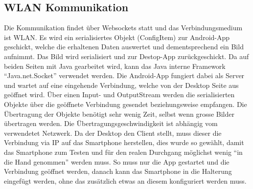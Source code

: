 \subsection{WLAN Kommunikation}

Die Kommunikation findet über Websockets statt und das Verbindungsmedium ist WLAN.
Es wird ein serialisiertes Objekt (ConfigItem) zur Android-App geschickt, welche die erhaltenen 
Daten auswertet und dementsprechend ein Bild aufnimmt. Das Bild wird serialisiert und zur 
Destop-App zurückgeschickt.
Da auf beiden Seiten mit Java gearbeitet wird, kann das Java interne Framework \enquote{Java.net.Socket} verwendet werden. 
Die Android-App fungiert dabei als Server und wartet auf eine eingehende Verbindung, welche von der 
Desktop Seite aus geöffnet wird. Über einen Input- und OutputStream werden die serialisierten Objekte 
über die geöffnete Verbindung gesendet beziehungsweise empfangen. Die Übertragung der Objekte benötigt sehr 
wenig Zeit, selbst wenn grosse Bilder übertragen werden. Die Übertragungsgeschwindigkeit ist abhängig vom verwendetet Netzwerk. 
Da der Desktop den Client stellt, muss dieser die Verbindung via IP auf das Smartphone herstellen, 
dies wurde so gewählt, damit das Smartphone zum Testen und für den realen Durchgang möglichst wenig 
\enquote{in die Hand genommen} werden muss. So muss nur die App gestartet und die Verbindung geöffnet werden, 
danach kann das Smartphone in die Halterung eingefügt werden, ohne das zusätzlich etwas an diesem konfiguriert werden muss. 

            
